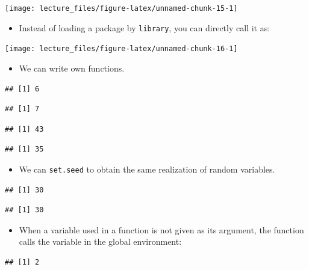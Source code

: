 \documentclass[
]{book}
\providecommand{\tightlist}{%
  \setlength{\itemsep}{0pt}\setlength{\parskip}{0pt}}
\begin{document}
\begin{center}\texttt{[image: lecture\_files/figure-latex/unnamed-chunk-15-1]} \end{center}

\begin{itemize}
\tightlist
\item
  Instead of loading a package by \texttt{library}, you can directly call it as:
\end{itemize}

\begin{center}\texttt{[image: lecture\_files/figure-latex/unnamed-chunk-16-1]} \end{center}

\begin{itemize}
\tightlist
\item
  We can write own functions.
\end{itemize}

\begin{verbatim}
## [1] 6
\end{verbatim}

\begin{verbatim}
## [1] 7
\end{verbatim}

\begin{verbatim}
## [1] 43
\end{verbatim}

\begin{verbatim}
## [1] 35
\end{verbatim}

\begin{itemize}
\tightlist
\item
  We can \texttt{set.seed} to obtain the same realization of random variables.
\end{itemize}

\begin{verbatim}
## [1] 30
\end{verbatim}

\begin{verbatim}
## [1] 30
\end{verbatim}

\begin{itemize}
\tightlist
\item
  When a variable used in a function is not given as its argument, the function calls the variable in the global environment:
\end{itemize}

\begin{verbatim}
## [1] 2
\end{verbatim}
\end{document}
